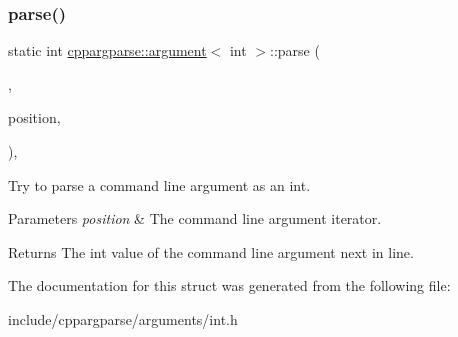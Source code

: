 \subsubsection{\texorpdfstring{parse()}{parse()}}
{\footnotesize\ttfamily static int \hyperlink{structcppargparse_1_1argument}{cppargparse\+::argument}$<$ int $>$\+::parse (\begin{DoxyParamCaption}\item[{const types\+::\+Command\+Line\+\_\+t \&}]{,  }\item[{const types\+::\+Command\+Line\+Position\+\_\+t \&}]{position,  }\item[{const types\+::\+Command\+Line\+Arguments\+\_\+t \&}]{ }\end{DoxyParamCaption})\hspace{0.3cm}{\ttfamily [inline]}, {\ttfamily [static]}}



Try to parse a command line argument as an int. 


\begin{DoxyParams}{Parameters}
{\em position} & The command line argument iterator.\\
\hline
\end{DoxyParams}
\begin{DoxyReturn}{Returns}
The int value of the command line argument next in line. 
\end{DoxyReturn}


The documentation for this struct was generated from the following file\+:\begin{DoxyCompactItemize}
\item 
include/cppargparse/arguments/int.\+h\end{DoxyCompactItemize}
